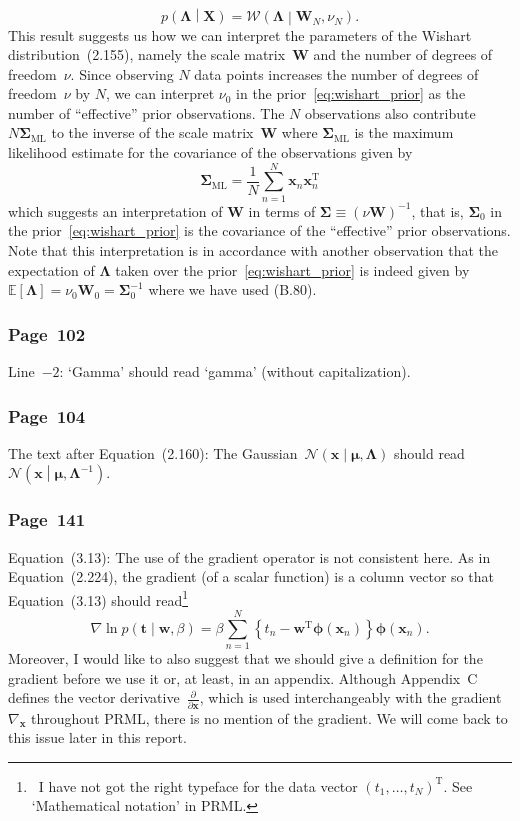 \documentclass[12pt,a4paper]{article}
\newcommand{\erratum}[1]{\subsubsection*{#1}}
\begin{document}
\begin{equation}
p\left(\bm{\Lambda}\middle|\mathbf{X}\right) =
\mathcal{W}\left(\bm{\Lambda}\middle|\mathbf{W}_N, \nu_N\right) .
\end{equation}
This result suggests us how we can interpret the parameters of
the Wishart distribution~(2.155), namely
the scale matrix~$\mathbf{W}$ and the number of degrees of freedom~$\nu$.
Since observing $N$ data points increases the number of degrees of freedom~$\nu$ by $N$,
we can interpret $\nu_0$ in the prior~\eqref{eq:wishart_prior} as
the number of ``effective'' prior observations.
The $N$ observations also contribute $N\bm{\Sigma}_{\text{ML}}$ to
the inverse of the scale matrix~$\mathbf{W}$
where $\bm{\Sigma}_{\text{ML}}$ is the maximum likelihood estimate for the covariance of
the observations given by
\begin{equation}
\bm{\Sigma}_{\text{ML}} = \frac{1}{N} \sum_{n=1}^{N}\mathbf{x}_n\mathbf{x}_n^{\operatorname{T}}
\end{equation}
which suggests an interpretation of $\mathbf{W}$ in terms of
$\bm{\Sigma} \equiv \left(\nu\mathbf{W}\right)^{-1}$, that is,
$\bm{\Sigma}_0$ in the prior~\eqref{eq:wishart_prior} is
the covariance of the ``effective'' prior observations.
Note that this interpretation is in accordance with another observation that
the expectation of $\bm{\Lambda}$ taken over the prior~\eqref{eq:wishart_prior} is indeed given by
$\mathbb{E}\left[\bm{\Lambda}\right] = \nu_0\mathbf{W}_0 = \bm{\Sigma}_0^{-1}$
where we have used (B.80).

\erratum{Page~102}
Line~$-2$:
`Gamma' should read `gamma' (without capitalization).

\erratum{Page~104}
The text after Equation~(2.160):
The Gaussian~$\mathcal{N}\left(\mathbf{x}\middle|\bm{\mu}, \mathbf{\Lambda}\right)$
should read $\mathcal{N}\left(\mathbf{x}\middle|\bm{\mu}, \mathbf{\Lambda}^{-1}\right)$.

\erratum{Page~141}
Equation~(3.13):
The use of the gradient operator is not consistent here.
As in Equation~(2.224), the gradient (of a scalar function) is a column vector
so that Equation~(3.13) should read\footnote{\
I have not got the right typeface for the data vector
$\left( t_1, \dots, t_N \right)^{\operatorname{T}}$.
See `Mathematical notation' in PRML.}
\begin{equation}
\nabla \ln p \left( \mathbf{t} \middle| \mathbf{w}, \beta \right) =
\beta \sum_{n=1}^{N}
\left\{ t_n - \mathbf{w}^{\operatorname{T}} \bm{\phi}\left( \mathbf{x}_n \right) \right\}
\bm{\phi}\left( \mathbf{x}_n \right) .
\label{eq:gradient_of_linear_regression_likelihood}
\end{equation}
Moreover, I would like to also suggest that we should give a definition for the gradient
before we use it or, at least, in an appendix.
Although Appendix~C defines the vector derivative~$\frac{\partial}{\partial \mathbf{x}}$,
which is used interchangeably with the gradient~$\nabla_{\mathbf{x}}$ throughout PRML,
there is no mention of the gradient.
We will come back to this issue later in this report.
\end{document}
